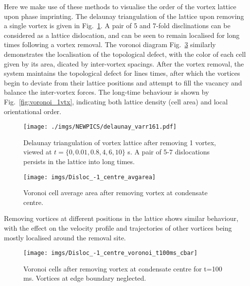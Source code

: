 Here we make use of these methods to visualise the order of the vortex lattice upon phase imprinting. The delaunay triangulation of the lattice upon removing a single vortex is given in Fig.~\ref{fig:deltri_1vtx}. A pair of 5 and 7-fold disclinations can be considered as a lattice dislocation, and can be seen to remain localised for long times following a vortex removal. The voronoi diagram Fig.~\ref{fig:voronoi_100ms} similarly demonstrates the localisation of the topological defect, with the color of each cell given by its area, dicated by inter-vortex spacings. After the vortex removal, the system maintains the topological defect for lines times, after which the vortices begin to deviate from their lattice positions and attempt to fill the vacancy and balance
the inter-vortex forces. The long-time behaviour is shown by Fig.~\ref{fig:voronoi_1vtx}, indicating both lattice density (cell area) and local orientational order.



\begin{figure}[bt]
    \texttt{[image: ./imgs/NEWPICS/delaunay\_varr161.pdf]}
    \caption{Delaunay triangulation of vortex lattice after removing 1 vortex, viewed at $t=\{0,0.01,0.8,4,6,10\}$ s. A pair of 5-7 dislocations persists in the lattice into long times.}\label{fig:deltri_1vtx}
\end{figure}

\begin{figure}[tb]
	\texttt{[image: imgs/Disloc\_-1\_centre\_avgarea]}
	\caption{Voronoi cell average area after removing vortex at condensate centre. }
	\label{fig:voronoi_area}
\end{figure}

Removing vortices at different positions in the lattice shows similar behaviour, with the effect on the velocity profile and trajectories of other vortices being mostly localised around the removal site.

\begin{figure}[tb]
	\texttt{[image: imgs/Disloc\_-1\_centre\_voronoi\_t100ms\_cbar]}
	\caption{Voronoi cells after removing vortex at condensate centre for t=100 ms. Vortices at edge boundary neglected. }
	\label{fig:voronoi_100ms}
\end{figure}


